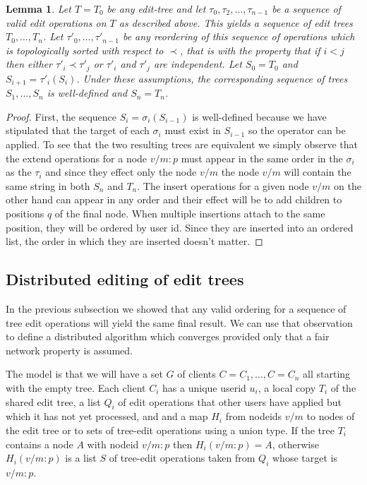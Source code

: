 \documentclass{amsart}
\newtheorem{lemma}[theorem]{Lemma}
\begin{document}
\begin{lemma}
Let $T=T_0$ be any edit-tree and let $\tau_0,\tau_2,\ldots,\tau_{n-1}$
be a sequence of valid edit operations on $T$ as described above.
This yields a sequence of edit trees $T_0,\ldots,T_n$. Let 
$\tau'_0,\ldots,\tau'_{n-1}$ be any reordering of this sequence of operations
which is topologically sorted with respect to $\prec$, that is
with the property that if $i<j$ then either $\tau'_i\prec\tau'_j$ or
$\tau'_i$ and $\tau'_j$ are independent. Let $S_0=T_0$ and $S_{i+1} = \tau'_i(S_i)$.
Under these assumptions, the corresponding sequence of trees
$S_1,\ldots,S_n$ is well-defined and $S_n=T_n$.
\end{lemma}

\begin{proof}
First, the sequence $S_{i}=\sigma_i(S_{i-1})$ is well-defined because we have
stipulated that the target of each $\sigma_i$ must exist in $S_{i-1}$ so the
operator can be applied. To see that the two resulting trees are equivalent
we simply observe that the extend operations for a node $v/m:p$ must appear
in the same order in the $\sigma_i$ as the $\tau_i$ and since they effect only
the node $v/m$ the node $v/m$ will contain the same string in both $S_n$ and $T_n$.
The insert operations for a given node $v/m$ on the other hand can appear
in any order and their effect will be to add children to positions $q$
of the final node. When multiple insertions attach to the same position, they
will be ordered by user id. Since they are inserted into an ordered list,
the order in which they are inserted doesn't matter.
\end{proof}

\subsection{Distributed editing of edit trees}
In the previous subsection we showed that any valid ordering for a sequence
of tree edit operations will yield the same final result. We can use that
observation to define a distributed algorithm which converges provided only
that a fair network property is assumed.

The model is that we will have a set $G$ of clients $C=C_1,\ldots,C=C_n$
all starting with the empty tree. Each client $C_i$ has a unique userid $u_i$,
a local copy $T_i$ of the shared edit tree,
a list $Q_i$ of edit operations that other users have applied but which it
has not yet processed, and
and a map $H_i$ from nodeids $v/m$ to nodes of the edit tree or to sets of tree-edit operations using a union type. If the tree $T_i$ contains a node $A$ with nodeid $v/m:p$ then $H_i(v/m:p)=A$, otherwise $H_i(v/m:p)$ is a list $S$ of tree-edit operations taken from $Q_i$ whose target is $v/m:p$.
\end{document}
